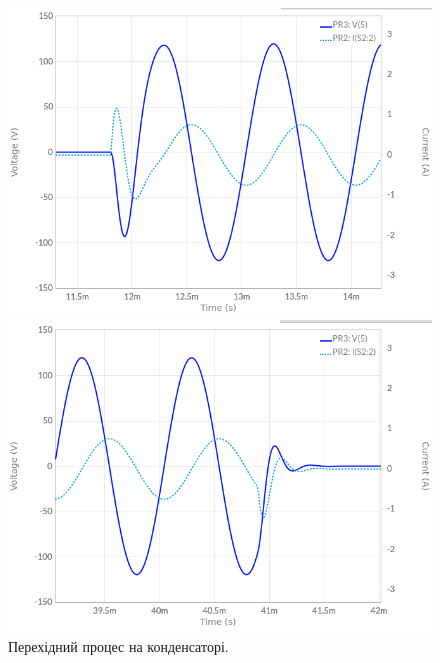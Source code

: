\documentclass{article}
\begin{document}
\begin{normalsize}
	\begin{figure}[H]
		\begin{minipage}[t]{0.45\textwidth}
			\centering
			\includegraphics[width=\textwidth]{41}
		\end{minipage}
		\hfill
		\begin{minipage}[t]{0.45\textwidth}
			\centering
			\includegraphics[width=\textwidth]{42}
		\end{minipage}
		\caption{Перехідний процес на конденсаторі.}
	\end{figure}	


\end{normalsize}
\end{document}
